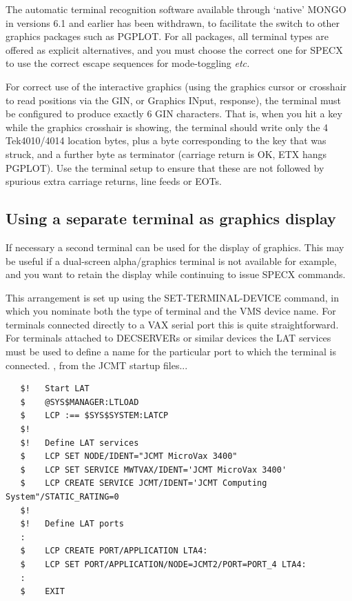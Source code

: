 \documentclass[11pt,twoside]{report}
\begin{document}
The automatic terminal recognition software available through `native' MONGO
in versions 6.1 and earlier has been withdrawn, to facilitate the switch to
other graphics packages such as PGPLOT. For all packages, all terminal types
are offered as explicit alternatives, and you must choose the correct one
for SPECX to use the correct escape sequences for mode-toggling {\it etc.}

For correct use of the interactive graphics (using the graphics cursor or
crosshair to read positions via the GIN, or Graphics INput, response), the terminal
must be configured to produce exactly 6 GIN characters. That is, when you hit a
key while the graphics crosshair is showing, the terminal should write only
the 4 Tek4010/4014 location bytes, plus a byte corresponding to the key that
was struck, and a further byte as terminator (carriage return is OK, ETX hangs
PGPLOT). Use the terminal setup to ensure that these are not followed by
spurious extra carriage returns, line feeds or EOTs. 

\subsection{Using a separate terminal as graphics display}

\label{graphics}
If necessary a second terminal can be used for the display of graphics. 
This may be useful if a dual-screen alpha/graphics terminal is not available
for example, and you want to retain the display while continuing to issue
SPECX commands. 

This arrangement is set up using the SET-TERMINAL-DEVICE command, in which
you nominate both the type of terminal and the VMS device name. For terminals
connected directly to a VAX serial port this is quite straightforward. For
terminals attached to DECSERVERs or similar devices the LAT services must
be used to define a name for the particular port to which the terminal is
connected. \eg, from the JCMT startup files...

\begin{verbatim}
   $!   Start LAT
   $    @SYS$MANAGER:LTLOAD
   $    LCP :== $SYS$SYSTEM:LATCP
   $!
   $!   Define LAT services
   $    LCP SET NODE/IDENT="JCMT MicroVax 3400"
   $    LCP SET SERVICE MWTVAX/IDENT='JCMT MicroVax 3400'
   $    LCP CREATE SERVICE JCMT/IDENT='JCMT Computing System"/STATIC_RATING=0
   $!
   $!   Define LAT ports
   :
   $    LCP CREATE PORT/APPLICATION LTA4:
   $    LCP SET PORT/APPLICATION/NODE=JCMT2/PORT=PORT_4 LTA4:
   :
   $    EXIT
\end{verbatim}
\end{document}
